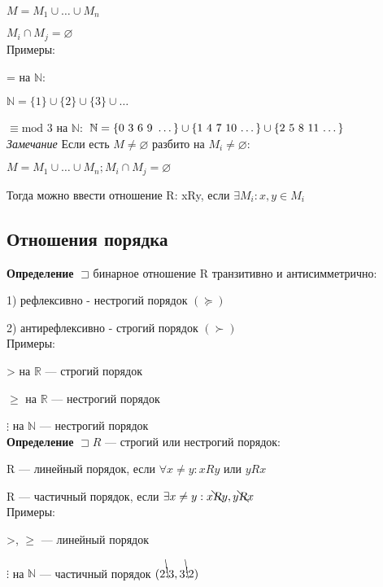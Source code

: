 \documentclass[a4paper, 12pt] {article}
\begin{document}
	$M = M_{1} \cup \dots \cup M_{n}$
	
	$M_{i} \cap M_{j} = \varnothing$\\
	
	
	Примеры:
	
	= на $\mathbb N:$
	
	$\mathbb N = \{1\} \cup \{2\} \cup \{3\} \cup \dots$
	
	$\equiv \text{mod 3} \text{ на } \mathbb N:$
	$\mathbb N = \{ \text{0 3 6 9 }\dots \} \cup \{ \text{1 4 7 10 \dots } \} \cup \{ \text{2 5 8 11 \dots } \}$\\
	
	
	\textit{Замечание}
	Если есть $M \ne \varnothing$ разбито на $M_{i} \ne \varnothing:$ 
	
	$M = M_{1} \cup \dots \cup M_{n}; M_{i} \cap M_{j} = \varnothing$
	
	Тогда можно ввести отношение R: xRy, если $\exists M_{i}: x, y \in M_{i}$
	
	\subsection{Отношения порядка}

	\textbf{Определение}
	$\sqsupset \text{ бинарное отношение R транзитивно и антисимметрично:}$
	
	1) рефлексивно - нестрогий порядок $( \succeq  )$
	
	2) антирефлексивно - строгий порядок $( \succ  )$\\
	
	
	Примеры:
	
	> на $\mathbb R$ --- строгий порядок 
	
	$\ge$ на $\mathbb R$ --- нестрогий порядок 
	
	$\vdots$ на $\mathbb N$ --- нестрогий порядок \\
	
	
	\textbf{Определение}
	$\sqsupset R$ --- строгий или нестрогий порядок:
	
	R --- линейный порядок, если $\forall x \ne y: xRy \text{ или } yRx$ 
	
	R --- частичный порядок, если $\exists x \ne y: x \bcancel Ry, \text{} y \bcancel Rx$\\
	
	
	Примеры:
	
	>, $\ge$ --- линейный порядок 
	
	$\vdots$ на $\mathbb N$ --- частичный порядок $(2 \bcancel \vdots 3, 3 \bcancel \vdots 2)$\\
	
\end{document}

